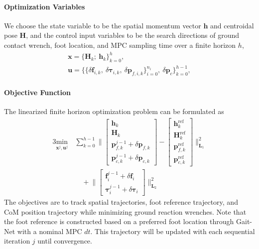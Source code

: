 \paragraph{Optimization Variables}
We choose the state variable to be the spatial momentum vector $\bm h$ and centroidal pose $\bm H$, and the control input variables to be the search directions of ground contact wrench, foot location, and MPC sampling time over a finite horizon $h$,
\begin{align}
    \bm {x} = \bigl\{ \bm H_{k};\: {\bm h}_{k}\bigr\}^{h}_{k=0}, \quad\quad\quad\quad\quad\\
    \bm {u} = \bigl\{\{\delta \bm f_{i,k},\: \delta \bm \tau_{i,k},\: \delta \bm p_{f,i,k}\}^{n_i}_{i=0},\:\delta \bm p_{c} \bigr\}^{h-1}_{k=0},
\end{align}

\paragraph{Objective Function}
The linearized finite horizon optimization problem can be formulated as 
\begin{alignat}{3}
    \label{eq:CDMPCcost2}
    \underset{\bm x^j, \bm {u}^j}{\text{min}} \: & \sum_{k = 0}^{h-1} \Bigg\| 
    \begin{bmatrix}
        \bm h_{k} \\ \bm H_{k} \\ \bm p^{j-1}_{f,k} +\delta \bm p_{f,k} \\ \bm p^{j-1}_{c,k} +\delta \bm p_{c,k}
    \end{bmatrix} -
    \begin{bmatrix}
        \bm h_{k}^{\text{ref}} \\ \bm H_{k}^{\text{ref}} \\ \bm p_{f,k}^{\text{ref}}\\ \bm p_{c,k}^{\text{ref}}
    \end{bmatrix}
    \Bigg\|^2 _{\bm L_1} \\ \nonumber & \quad +
    \Bigg\| \begin{bmatrix} 
    \bm f^{j-1}_i + \delta \bm f_i \\ \bm \tau^{j-1}_i  + \delta \bm \tau_i 
    \end{bmatrix} \Bigg\|^2 _{\bm L_2}
\end{alignat}
The objectives are to track spatial trajectories, foot reference trajectory, and CoM position trajectory while minimizing ground reaction wrenches. Note that the foot reference is constructed based on a preferred foot location through Gait-Net with a nominal MPC $dt$. This trajectory will be updated with each sequential iteration $j$ until convergence.
